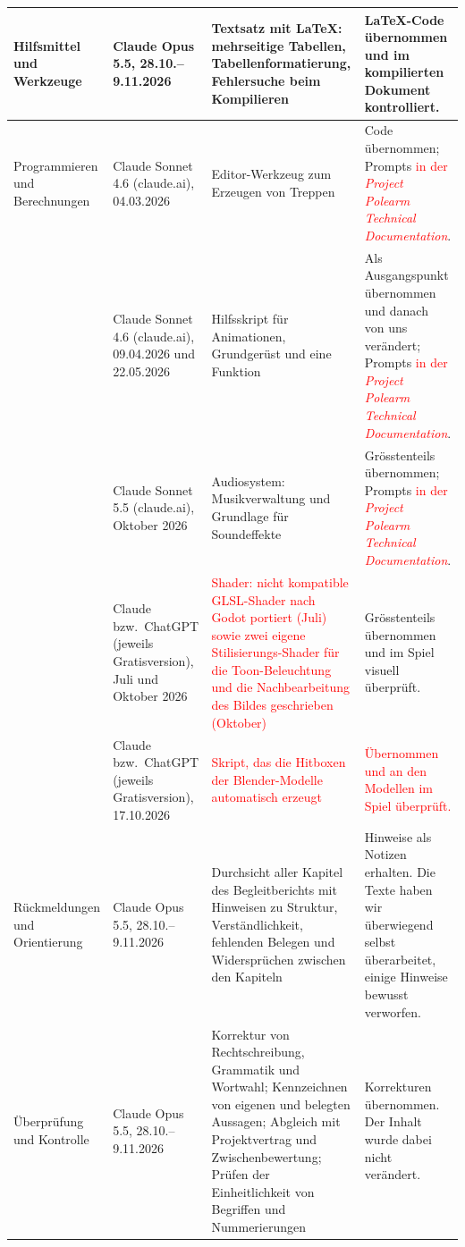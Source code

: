 \documentclass[../Main.tex]{subfiles}
\begin{document}
{\begin{longtable}{|>{\raggedright\arraybackslash}p{2.3cm}|>{\raggedright\arraybackslash}p{2.4cm}|>{\raggedright\arraybackslash}p{4.4cm}|>{\raggedright\arraybackslash}p{4.6cm}|}
        \hline
        Hilfsmittel und Werkzeuge & Claude Opus 5.5, 28.10.--9.11.2026 & Textsatz mit \LaTeX: mehrseitige Tabellen, Tabellenformatierung, Fehlersuche beim Kompilieren & \LaTeX-Code übernommen und im kompilierten Dokument kontrolliert. \\
        \hline
        Programmieren und Berechnungen & Claude Sonnet 4.6 (claude.ai), 04.03.2026 & Editor-Werkzeug zum Erzeugen von Treppen & Code übernommen; Prompts \textcolor{red}{in der \textit{Project Polearm Technical Documentation}}. \\
        \hline
        & Claude Sonnet 4.6 (claude.ai), 09.04.2026 und 22.05.2026 & Hilfsskript für Animationen, Grundgerüst und eine Funktion & Als Ausgangspunkt übernommen und danach von uns verändert; Prompts \textcolor{red}{in der \textit{Project Polearm Technical Documentation}}. \\
        \hline
        & Claude Sonnet 5.5 (claude.ai), Oktober 2026 & Audiosystem: Musikverwaltung und Grundlage für Soundeffekte & Grösstenteils übernommen; Prompts \textcolor{red}{in der \textit{Project Polearm Technical Documentation}}. \\
        \hline
        & Claude bzw.\ ChatGPT (jeweils Gratisversion), Juli und Oktober 2026 & \textcolor{red}{Shader: nicht kompatible GLSL-Shader nach Godot portiert (Juli) sowie zwei eigene Stilisierungs-Shader für die Toon-Beleuchtung und die Nachbearbeitung des Bildes geschrieben (Oktober)} & Grösstenteils übernommen und im Spiel visuell überprüft. \\
        \hline
        & Claude bzw.\ ChatGPT (jeweils Gratisversion), 17.10.2026 & \textcolor{red}{Skript, das die Hitboxen der Blender-Modelle automatisch erzeugt} & \textcolor{red}{Übernommen und an den Modellen im Spiel überprüft.} \\
        \hline
        Rückmeldungen und Orientierung & Claude Opus 5.5, 28.10.--9.11.2026 & Durchsicht aller Kapitel des Begleitberichts mit Hinweisen zu Struktur, Verständlichkeit, fehlenden Belegen und Widersprüchen zwischen den Kapiteln & Hinweise als Notizen erhalten. Die Texte haben wir überwiegend selbst überarbeitet, einige Hinweise bewusst verworfen. \\
        \hline
        Überprüfung und Kontrolle & Claude Opus 5.5, 28.10.--9.11.2026 & Korrektur von Rechtschreibung, Grammatik und Wortwahl; Kennzeichnen von eigenen und belegten Aussagen; Abgleich mit Projektvertrag und Zwischenbewertung; Prüfen der Einheitlichkeit von Begriffen und Nummerierungen & Korrekturen übernommen. Der Inhalt wurde dabei nicht verändert. \\

\end{longtable}}
\end{document}

